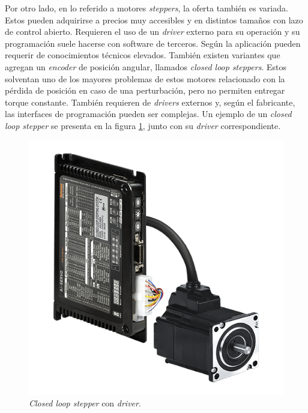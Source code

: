 Por otro lado, en lo referido a motores \textit{steppers}, la oferta también es variada. Estos pueden adquirirse a precios muy accesibles y en distintos tamaños con lazo de control abierto. Requieren el uso de un \textit{driver} externo para su operación y su programación suele hacerse con software de terceros. Según la aplicación pueden requerir de conocimientos técnicos elevados. También existen variantes que agregan un \textit{encoder} de posición angular,  llamados \textit{closed loop steppers}. Estos solventan uno de los mayores problemas de estos motores relacionado con la pérdida de posición en caso de una perturbación, pero no permiten entregar torque constante. También requieren de \textit{drivers} externos y, según el fabricante, las interfaces de programación pueden ser complejas. Un ejemplo de un \textit{closed loop stepper} \citep{web_closed_loop_stepper} se presenta en la figura \ref{fig:closed-loop-stepper}, junto con su \textit{driver} correspondiente.

\begin{figure}[h!]
	\centering
	\includegraphics[scale=.35]{./Figures/closed_loop_stepper.png}
	\caption{\textit{Closed loop stepper} con \textit{driver}\protect\footnotemark .}
	\label{fig:closed-loop-stepper}
\end{figure}


